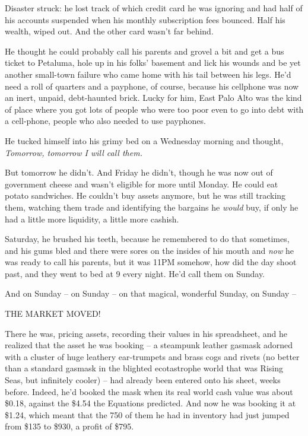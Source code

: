 Disaster struck: he lost track of which credit card he was ignoring
and had half of his accounts suspended when his monthly
subscription fees bounced. Half his wealth, wiped out. And the
other card wasn't far behind.

He thought he could probably call his parents and grovel a bit and
get a bus ticket to Petaluma, hole up in his folks' basement and
lick his wounds and be yet another small-town failure who came home
with his tail between his legs. He'd need a roll of quarters and a
payphone, of course, because his cellphone was now an inert,
unpaid, debt-haunted brick. Lucky for him, East Palo Alto was the
kind of place where you got lots of people who were too poor even
to go into debt with a cell-phone, people who also needed to use
payphones.

He tucked himself into his grimy bed on a Wednesday morning and
thought, \emph{Tomorrow, tomorrow I will call them.}

But tomorrow he didn't. And Friday he didn't, though he was now out
of government cheese and wasn't eligible for more until Monday. He
could eat potato sandwiches. He couldn't buy assets anymore, but he
was still tracking them, watching them trade and identifying the
bargains he \emph{would} buy, if only he had a little more
liquidity, a little more cashish.

Saturday, he brushed his teeth, because he remembered to do that
sometimes, and his gums bled and there were sores on the insides of
his mouth and \emph{now} he was ready to call his parents, but it
was 11PM somehow, how did the day shoot past, and they went to bed
at 9 every night. He'd call them on Sunday.

And on Sunday -- on Sunday -- on that magical, wonderful Sunday, on
Sunday --

THE MARKET MOVED!

There he was, pricing assets, recording their values in his
spreadsheet, and he realized that the asset he was booking -- a
steampunk leather gasmask adorned with a cluster of huge leathery
ear-trumpets and brass cogs and rivets (no better than a standard
gasmask in the blighted ecotastrophe world that was Rising Seas,
but infinitely cooler) -- had already been entered onto his sheet,
weeks before. Indeed, he'd booked the mask when its real world cash
value was about \$0.18, against the \$4.54 the Equations predicted.
And now he was booking it at \$1.24, which meant that the 750 of
them he had in inventory had just jumped from \$135 to \$930, a
profit of \$795.


